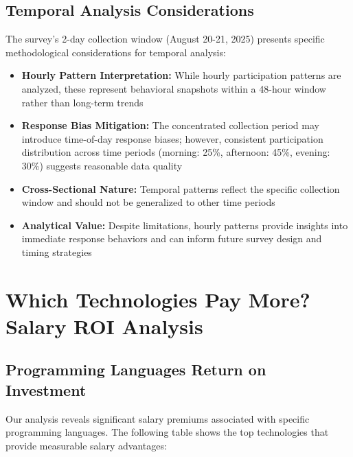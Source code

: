 \documentclass[12pt,a4paper]{article}
\begin{document}
\subsection{Temporal Analysis Considerations}
The survey's 2-day collection window (August 20-21, 2025) presents specific methodological considerations for temporal analysis:

\begin{itemize}
    \item \textbf{Hourly Pattern Interpretation:} While hourly participation patterns are analyzed, these represent behavioral snapshots within a 48-hour window rather than long-term trends
    \item \textbf{Response Bias Mitigation:} The concentrated collection period may introduce time-of-day response biases; however, consistent participation distribution across time periods (morning: 25\%, afternoon: 45\%, evening: 30\%) suggests reasonable data quality
    \item \textbf{Cross-Sectional Nature:} Temporal patterns reflect the specific collection window and should not be generalized to other time periods
    \item \textbf{Analytical Value:} Despite limitations, hourly patterns provide insights into immediate response behaviors and can inform future survey design and timing strategies
\end{itemize}

\section{Which Technologies Pay More? Salary ROI Analysis}

\subsection{Programming Languages Return on Investment}
Our analysis reveals significant salary premiums associated with specific programming languages. The following table shows the top technologies that provide measurable salary advantages:
\end{document}
